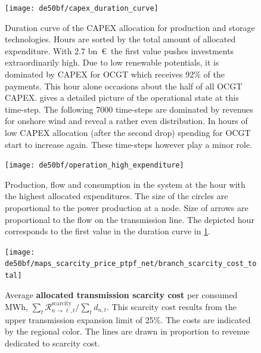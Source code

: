 \documentclass[11pt,twocolumn]{article}
\newcommand{\demand}[1][n]{d_{#1,t}}
\newcommand{\remainingcost}{\mathcal{R}}
\newcommand{\scarcitycost}{\remainingcost^\text{scarcity}}
\begin{document}
\begin{figure}
    \texttt{[image: de50bf/capex\_duration\_curve]}
    \caption{Duration curve of the CAPEX allocation for production and storage technologies. Hours are sorted by the total amount of allocated expenditure. With 2.7 bn~\euro\, the first value pushes investments extraordinarily high. Due to low renewable potentials, it is dominated by CAPEX for OCGT which receives 92\% of the payments. This hour alone occasions about the half of all OCGT CAPEX.  gives a detailed picture of the operational state at this time-step. The following 7000 time-steps are dominated by revenues for onshore wind and reveal a rather even distribution. In hours of low CAPEX allocation (after the second drop) spending for OCGT start to increase again. These time-steps however play a minor role.}
    \label{fig:capex_duration_curve}
\end{figure}

\begin{figure}
    \texttt{[image: de50bf/operation\_high\_expenditure]}
    \caption{Production, flow and consumption in the system at the hour with the highest allocated expenditures. The size of the circles are proportional to the power production at a node. Size of arrows are proportional to the flow on the transmission line. The depicted hour corresponds to the first value in the duration curve in \cref{fig:capex_duration_curve}.}
    \label{fig:operation_high_expenditure}
\end{figure}


\begin{figure}
    \texttt{[image: de50bf/maps\_scarcity\_price\_ptpf\_net/branch\_scarcity\_cost\_total]}
    \caption{Average \textbf{allocated transmission scarcity cost} per consumed MWh, $\sum_t \scarcitycost_{n \rightarrow \ell, t} / \sum_t \demand $. This scarcity cost results from the upper transmission expansion limit of 25\%. The costs are indicated by the regional color.  The lines are drawn in proportion to revenue dedicated to scarcity cost. }
    \label{fig:branch_scarcity_price}
\end{figure}
\end{document}
